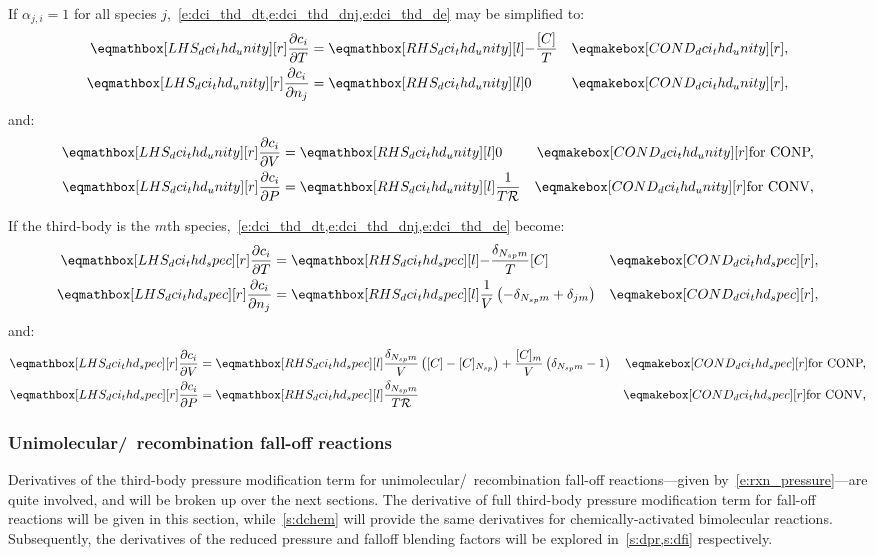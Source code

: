 \documentclass[12pt]{article}
\newcommand{\ns}{N_{sp}}
\newcommand{\conp}{CONP}
\newcommand{\conv}{CONV}
\newcommand{\dconp}{\ifmmode\text{for \conp,}\else for \conp,\fi}
\newcommand{\dconv}{\ifmmode\text{for \conv,}\else for \conv,\fi}
\newcommand{\Ru}{\mathcal{R}}
\begin{document}
If $\alpha_{j,i} = 1$ for all species $j$,~\cref{e:dci_thd_dt,e:dci_thd_dnj,e:dci_thd_de} may be simplified to:
\begin{align}
 \lhs{dci_thd_unity}{\frac{\partial c_{i} }{\partial T }} &= \rhs{dci_thd_unity}{- \frac{[C]}{T}}& \cond{dci_thd_unity}{,} \label{e:dci_thd_unity_dt} \\
 \lhs{dci_thd_unity}{\frac{\partial c_{i} }{\partial n_{j} }} &= \rhs{dci_thd_unity}{0}& \cond{dci_thd_unity}{,}
\end{align}
and:
\begin{subequations}
 \label{e:dci_thd_unity_de}
 \begin{align}
  \lhs{dci_thd_unity}{\frac{\partial c_{i} }{\partial V }} &= \rhs{dci_thd_unity}{0} & \cond{dci_thd_unity}{\dconp} \\
  \lhs{dci_thd_unity}{\frac{\partial c_{i} }{\partial P }} &= \rhs{dci_thd_unity}{\frac{1}{T \Ru}}& \cond{dci_thd_unity}{\dconv}
 \end{align}
\end{subequations}
 
If the third-body is the $m$th species,~\cref{e:dci_thd_dt,e:dci_thd_dnj,e:dci_thd_de} become:
\begin{align}
 \lhs{dci_thd_spec}{\frac{\partial c_{i} }{\partial T }} &= \rhs{dci_thd_spec}{-\frac{\delta_{\ns m}}{T} [C]}&\cond{dci_thd_spec}{,} \label{e:dci_thd_spec_dt} \\
 \lhs{dci_thd_spec}{\frac{\partial c_{i} }{\partial n_j }} &= \rhs{dci_thd_spec}{\frac{1}{V} \left(- \delta_{\ns m} + \delta_{j m}\right)}&\cond{dci_thd_spec}{,} \label{e:dci_thd_spec_dnj} \\
\end{align}
and:
\begin{subequations}
\label{e:dci_thd_spec_de}
\begin{align}
\lhs{dci_thd_spec}{\frac{\partial c_{i} }{\partial V }} &= \rhs{dci_thd_spec}{\frac{\delta_{\ns m}}{V} \left([C] - [C]_{\ns}\right) + \frac{[C]_{m}}{V} \left(\delta_{\ns m} - 1\right)} & \cond{dci_thd_spec}{\dconp} \\
\lhs{dci_thd_spec}{\frac{\partial c_{i} }{\partial P }} &= \rhs{dci_thd_spec}{\frac{\delta_{\ns m}}{T \Ru}} & \cond{dci_thd_spec}{\dconv}
\end{align}
\end{subequations}

\subsubsection{Unimolecular\slash~recombination fall-off reactions}
\label{s:dfall}
Derivatives of the third-body pressure modification term for unimolecular\slash~recombination fall-off reactions---given by~\cref{e:rxn_pressure}---are quite involved, and will be broken up over the next sections.
The derivative of full third-body pressure modification term for fall-off reactions will be given in this section, while~\cref{s:dchem} will provide the same derivatives for chemically-activated bimolecular reactions.
Subsequently, the derivatives of the reduced pressure and falloff blending factors will be explored in~\cref{s:dpr,s:dfi} respectively.
\end{document}
